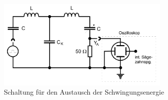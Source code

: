 \begin{figure}
    \centering
    \includegraphics[width=0.75\textwidth]{plots/Schaltung1.png}
    \caption{Schaltung für den Austausch der Schwingungsenergie \cite{Versuchsanleitung}}
    \label{fig:schaltung1}
\end{figure}